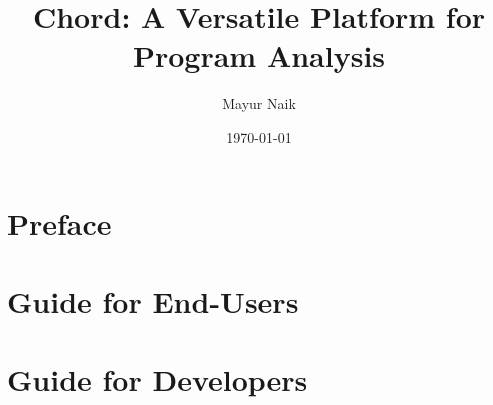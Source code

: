 \documentclass[openany]{book}
\title{Chord: A Versatile Platform for Program Analysis}
\author{Mayur Naik}
\date{\today}
\begin{document}
\maketitle


\part{Preface}




\part{Guide for End-Users}








\part{Guide for Developers}








\end{document}
